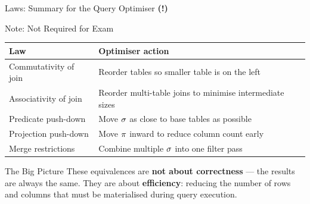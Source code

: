 \begin{frame}{Laws: Summary for the Query Optimiser \textbf{(!)}}
  \begin{alertblock}{Note: Not Required for Exam}
  \end{alertblock}

  \begin{center}
    \small
    \begin{tabular}{lp{6.5cm}}
      \toprule
      \textbf{Law} & \textbf{Optimiser action} \\
      \midrule
      Commutativity of join    & Reorder tables so smaller table is on the left \\
      Associativity of join    & Reorder multi-table joins to minimise intermediate sizes \\
      Predicate push-down      & Move $\sigma$ as close to base tables as possible \\
      Projection push-down     & Move $\pi$ inward to reduce column count early \\
      Merge restrictions       & Combine multiple $\sigma$ into one filter pass \\
      \bottomrule
    \end{tabular}
  \end{center}

  \vspace{0.6em}
  \begin{block}{The Big Picture}
    These equivalences are \textbf{not about correctness} --- the results are
    always the same.  They are about \textbf{efficiency}: reducing the number
    of rows and columns that must be materialised during query execution.
  \end{block}
\end{frame}
